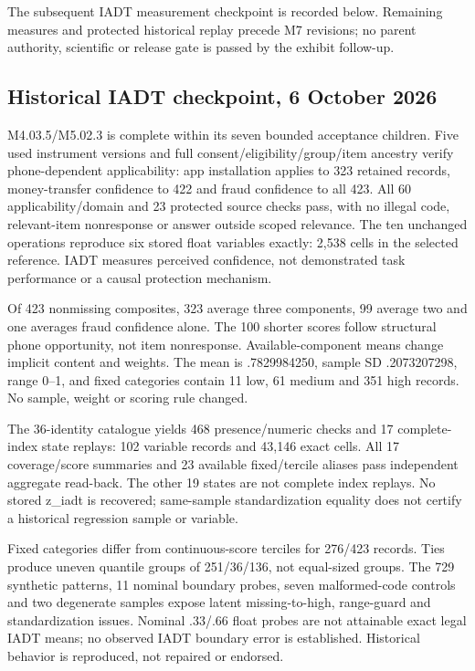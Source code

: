 \documentclass[11pt,a4paper]{article}
\begin{document}
The subsequent IADT measurement checkpoint is recorded below. Remaining
measures and protected historical replay precede M7 revisions; no parent
authority, scientific or release gate is passed by the exhibit follow-up.

\subsection{Historical IADT checkpoint, 6 October 2026}
M4.03.5/M5.02.3 is complete within its seven bounded acceptance children.
Five used instrument versions and full consent/eligibility/group/item ancestry
verify phone-dependent applicability: app installation applies to 323 retained
records, money-transfer confidence to 422 and fraud confidence to all 423.
All 60 applicability/domain and 23 protected source checks pass, with no
illegal code, relevant-item nonresponse or answer outside scoped relevance.
The ten unchanged operations reproduce six stored float variables exactly:
2,538 cells in the selected reference. IADT measures perceived confidence,
not demonstrated task performance or a causal protection mechanism.

Of 423 nonmissing composites, 323 average three components, 99 average two
and one averages fraud confidence alone. The 100 shorter scores follow
structural phone opportunity, not item nonresponse. Available-component
means change implicit content and weights. The mean is .7829984250,
sample SD .2073207298, range 0--1, and fixed categories contain 11 low,
61 medium and 351 high records. No sample, weight or scoring rule changed.

The 36-identity catalogue yields 468 presence/numeric checks and 17
complete-index state replays: 102 variable records and 43,146 exact cells.
All 17 coverage/score summaries and 23 available fixed/tercile aliases pass
independent aggregate read-back. The other 19 states are not complete index
replays. No stored z\_iadt is recovered; same-sample standardization equality
does not certify a historical regression sample or variable.

Fixed categories differ from continuous-score terciles for 276/423 records.
Ties produce uneven quantile groups of 251/36/136, not equal-sized groups.
The 729 synthetic patterns, 11 nominal boundary probes, seven malformed-code
controls and two degenerate samples expose latent missing-to-high,
range-guard and standardization issues. Nominal .33/.66 float probes are
not attainable exact legal IADT means; no observed IADT boundary error is
established. Historical behavior is reproduced, not repaired or endorsed.
\end{document}
